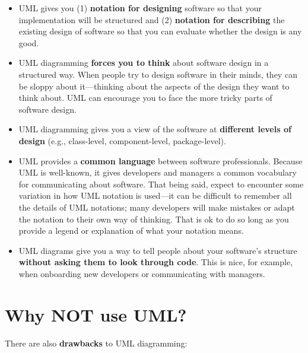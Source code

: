 \begin{itemize}
\item UML gives you (1) \textbf{notation for designing} software so that your implementation will be structured and (2) \textbf{notation for describing} the existing design of software so that you can evaluate whether the design is any good.\\
\item UML diagramming \textbf{forces you to think} about software design in a structured way. When people try to design software in their minds, they can be sloppy about it---thinking about the aspects of the design they want to think about. UML can encourage you to face the more tricky parts of software design.\\
\item UML diagramming gives you a view of the software at \textbf{different levels of design} (e.g., class-level, component-level, package-level).\\
\item UML provides a \textbf{common language} between software professionals. Because UML is well-known, it gives developers and managers a common vocabulary for communicating about software. That being said, expect to encounter some variation in how UML notation is used---it can be difficult to remember all the details of UML notations; many developers will make mistakes or adapt the notation to their own way of thinking. That is ok to do so long as you provide a legend or explanation of what your notation means.\\
\item UML diagrams give you a way to tell people about your software's structure \textbf{without asking them to look through code}. This is nice, for example, when onboarding new developers or communicating with managers.
\end{itemize}
\nomargins
\section{Why NOT use UML?}

There are also \textbf{drawbacks} to UML diagramming:\\

